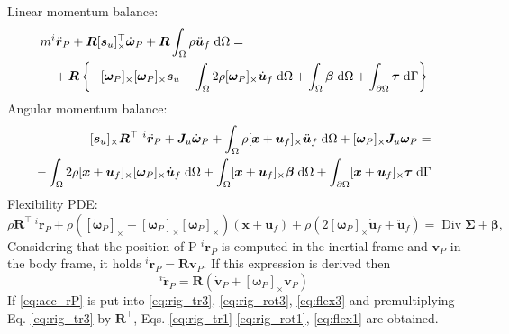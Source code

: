 \documentclass{svjour3}                     %
\DeclareMathOperator*{\Div}{Div}
\newcommand{\crmat}[1]{\ensuremath{[#1]_{\times}}}
\begin{document}
Linear momentum balance:
\begin{equation}
\label{eq:rig_tr3}
\begin{split}
&m ^{i}\ddot{\bm{r}}_P + \bm{R} \crmat{\bm{s}_u}^\top \dot{\bm{\omega}}_P  + \bm{R} \int_{\Omega} \rho \ddot{\bm{u}}_f \d{\Omega} = \\
&\quad + \bm{R} \left\{ -\crmat{\bm{\omega}_P} \crmat{\bm{\omega}_P} \bm{s}_u -  \int_{\Omega} 2 \rho \crmat{\bm{\omega}_P} \dot{\bm{u}}_f \d{\Omega} +  \int_{\Omega} \bm\beta \d{\Omega} +  \int_{\partial \Omega} \bm\tau \d{\Gamma}  \right\} 
\end{split}
\end{equation}
Angular momentum balance:
\begin{equation}
\label{eq:rig_rot3}
\begin{split}
\crmat{\bm{s}_u} {\bm{R}^{\top}} \ ^{i}\ddot{\bm{r}}_P + \bm{J}_u \dot{\bm\omega}_P + \int_{\Omega} \rho \crmat{\bm{x}+\bm{u}_f} \ddot{\bm{u}}_f \d{\Omega} + \crmat{\bm{\omega}_P} \bm{J}_u \bm{\omega}_P = \\ 
- \int_{\Omega} 2\rho \crmat{\bm{x}+\bm{u}_f} \crmat{\bm\omega_P} \dot{\bm{u}}_f \d{\Omega} + \int_{\Omega}\crmat{\bm{x}+\bm{u}_f} \bm\beta \d{\Omega} + \int_{\partial \Omega}\crmat{\bm{x}+\bm{u}_f} \bm\tau \d{\Gamma} \\
\end{split}
\end{equation}
Flexibility PDE:
\begin{equation}
\label{eq:flex3}
\rho  {\bm{R}^{\top}} \ ^{i}\ddot{\bm{r}}_P + \rho (\crmat{\dot{\bm\omega}_P} + \crmat{\bm{\omega}_P}\crmat{\bm{\omega}_P})(\bm{x}+\bm{u}_f) + \rho (2 \crmat{\bm{\omega}_P} \dot{\bm{u}}_f + \ddot{\bm{u}}_f) = \Div{\bm\Sigma} + \bm\beta,
\end{equation}
Considering that the position of P $^{i}{\bm{r}}_P$ is computed in the inertial frame and $\bm{v}_P$ in the body frame, it holds $^{i}\dot{\bm{r}}_P = \bm{R} \bm{v}_P$. If this expression is derived then
\begin{equation}
\label{eq:acc_rP}
^{i}\ddot{\bm{r}}_P = \bm{R} \left(\dot{\bm{v}}_P + \crmat{\bm{\omega}_P} \bm{v}_P \right) \end{equation}
If \eqref{eq:acc_rP} is put into \eqref{eq:rig_tr3}, \eqref{eq:rig_rot3}, \eqref{eq:flex3} and premultiplying  Eq. \eqref{eq:rig_tr3} by $\bm{R}^\top$, Eqs. \eqref{eq:rig_tr1} \eqref{eq:rig_rot1}, \eqref{eq:flex1} are obtained.
\end{document}
